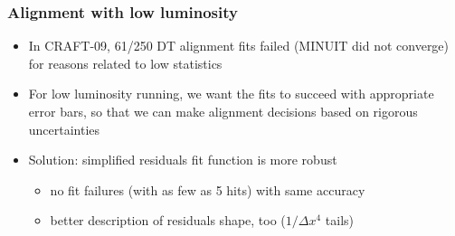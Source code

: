 \documentclass[compress]{beamer}
\begin{document}
\begin{frame}
\frametitle{Alignment with low luminosity}

\begin{itemize}
\item In CRAFT-09, 61/250 DT alignment fits failed (MINUIT did not
  converge) for reasons related to low statistics
\item For low luminosity running, we want the fits to succeed with
  appropriate error bars, so that we can make alignment decisions
  based on rigorous uncertainties
\item Solution: simplified residuals fit function is more robust
\begin{itemize}
\item no fit failures (with as few as 5 hits) with same accuracy
\item better description of residuals shape, too ($1/\Delta x^{4}$ tails)
\end{itemize}
\end{itemize}


\end{frame}
\end{document}
